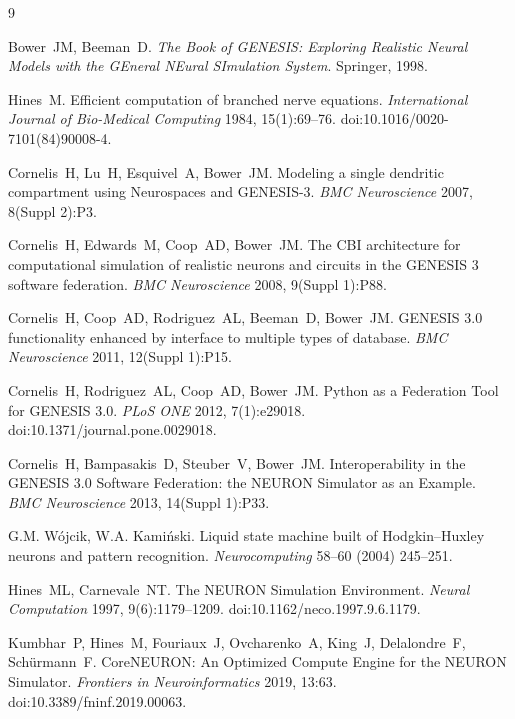 \begin{thebibliography}{9}

Bower~JM, Beeman~D.
\textit{The Book of GENESIS: Exploring Realistic Neural Models with the GEneral NEural SImulation System}.
Springer, 1998.

Hines~M.
Efficient computation of branched nerve equations.
\textit{International Journal of Bio-Medical Computing} 1984, 15(1):69--76. doi:10.1016/0020-7101(84)90008-4.

Cornelis~H, Lu~H, Esquivel~A, Bower~JM.
Modeling a single dendritic compartment using Neurospaces and GENESIS-3.
\textit{BMC Neuroscience} 2007, 8(Suppl 2):P3.

Cornelis~H, Edwards~M, Coop~AD, Bower~JM.
The CBI architecture for computational simulation of realistic neurons and circuits in the GENESIS 3 software federation.
\textit{BMC Neuroscience} 2008, 9(Suppl 1):P88.

Cornelis~H, Coop~AD, Rodriguez~AL, Beeman~D, Bower~JM.
GENESIS 3.0 functionality enhanced by interface to multiple types of database.
\textit{BMC Neuroscience} 2011, 12(Suppl 1):P15.

Cornelis~H, Rodriguez~AL, Coop~AD, Bower~JM.
Python as a Federation Tool for GENESIS 3.0.
\textit{PLoS ONE} 2012, 7(1):e29018. doi:10.1371/journal.pone.0029018.

Cornelis~H, Bampasakis~D, Steuber~V, Bower~JM.
Interoperability in the GENESIS 3.0 Software Federation: the NEURON Simulator as an Example.
\textit{BMC Neuroscience} 2013, 14(Suppl 1):P33.

G.M. W\'ojcik, W.A. Kami\'nski.
Liquid state machine built of Hodgkin--Huxley neurons and pattern recognition.
\textit{Neurocomputing} 58--60 (2004) 245--251.

Hines~ML, Carnevale~NT.
The NEURON Simulation Environment.
\textit{Neural Computation} 1997, 9(6):1179--1209. doi:10.1162/neco.1997.9.6.1179.

Kumbhar~P, Hines~M, Fouriaux~J, Ovcharenko~A, King~J, Delalondre~F, Sch\"urmann~F.
CoreNEURON: An Optimized Compute Engine for the NEURON Simulator.
\textit{Frontiers in Neuroinformatics} 2019, 13:63. doi:10.3389/fninf.2019.00063.


\end{thebibliography}
